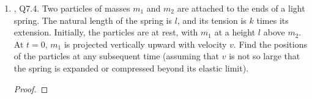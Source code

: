 \documentclass[../psets.tex]{subfiles}
\begin{document}
\begin{enumerate}
\begin{proof}
        \begin{equation*}
            \boxed{m_1 \geq 0.00125\,M_\text{S}}
        \end{equation*}
    \end{proof}
    \item \textcite{bib:KibbleBerkshire}, Q7.4. Two particles of masses $m_1$ and $m_2$ are attached to the ends of a light spring. The natural length of the spring is $l$, and its tension is $k$ times its extension. Initially, the particles are at rest, with $m_1$ at a height $l$ above $m_2$. At $t=0$, $m_1$ is projected vertically upward with velocity $v$. Find the positions of the particles at any subsequent time (assuming that $v$ is not so large that the spring is expanded or compressed beyond its elastic limit).
    \begin{proof}


\end{proof}
\end{enumerate}
\end{document}

